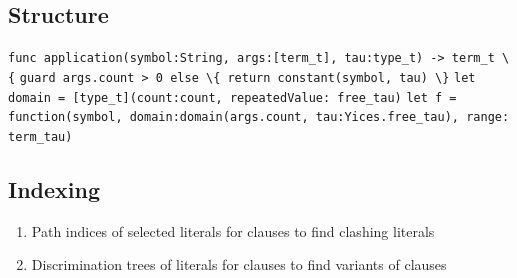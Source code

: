
\subsection{Structure}

\begin{frame}
\lstinline|func application(symbol:String, args:[term_t], tau:type_t) -> term_t \{|
%	    	
\lstinline|guard args.count > 0 else \{ return constant(symbol, tau) \}|
\lstinline|let domain = [type_t](count:count, repeatedValue: free_tau)|
%	    	
\lstinline|let f = function(symbol, domain:domain(args.count, tau:Yices.free_tau), range: term_tau)|
	\end{frame}

\subsection{Indexing}

\begin{frame}
	\begin{enumerate}
		\item Path indices of selected literals for clauses to find clashing literals
		\item Discrimination trees of literals for clauses to find variants of clauses
	\end{enumerate}
	\end{frame}


%
%
%
%
%
%
%
%
%
%
%

